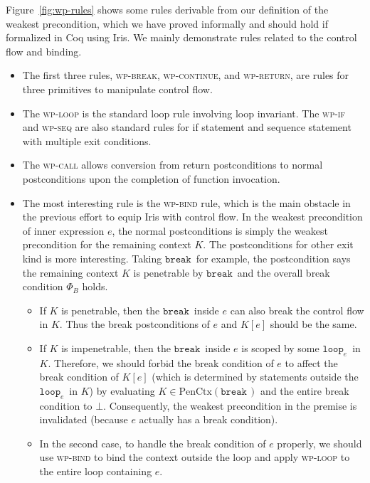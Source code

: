 \documentclass{article}
\numberwithin{algorithm}{section}
\newcommand{\cloop}[1]{\texttt{loop}_{#1}\,}
\newcommand{\cbreak}{\texttt{break}\,}
\newcommand{\pure}[1]{\text{PenCtx}(#1)}
\begin{document}
Figure~\ref{fig:wp-rules} shows some rules derivable from our definition of the weakest precondition, which we have proved informally and should hold if formalized in Coq using Iris.
We mainly demonstrate rules related to the control flow and binding.

\begin{itemize}
    \item The first three rules, \textsc{wp-break}, \textsc{wp-continue}, and \textsc{wp-return}, are rules for three primitives to manipulate control flow.
    \item The \textsc{wp-loop} is the standard loop rule involving loop invariant.
    The \textsc{wp-if} and \textsc{wp-seq} are also standard rules for if statement and sequence statement with multiple exit conditions.
    \item The \textsc{wp-call} allows conversion from return postconditions to normal postconditions upon the completion of function invocation.
    \item The most interesting rule is the \textsc{wp-bind} rule, which is the main obstacle in the previous effort to equip Iris with control flow.
    In the weakest precondition of inner expression $e$, the normal postconditions is simply the weakest precondition for the remaining context $K$.
    The postconditions for other exit kind is more interesting. Taking $\cbreak\!$ for example, the postcondition says the remaining context $K$ is penetrable by $\cbreak\!$ and the overall break condition $\Phi_B$ holds. \begin{itemize}
        \item If $K$ is penetrable, then the $\cbreak\!$ inside $e$ can also break the control flow in $K$. Thus the break postconditions of $e$ and $K[e]$ should be the same.
        \item If $K$ is impenetrable, then the $\cbreak\!$ inside $e$ is scoped by some $\cloop{e}\!$ in $K$. Therefore, we should forbid the break condition of $e$ to affect the break condition of $K[e]$ (which is determined by statements outside the $\cloop{e}\!$ in $K$) by evaluating $K \in \pure{\cbreak\!}$ and the entire break condition to $\bot$.
        Consequently, the weakest precondition in the premise is invalidated (because $e$ actually has a break condition).
        \item In the second case, to handle the break condition of $e$ properly, we should use \textsc{wp-bind} to bind the context outside the loop and apply \textsc{wp-loop} to the entire loop containing $e$.
    \end{itemize}
\end{itemize}
\end{document}
